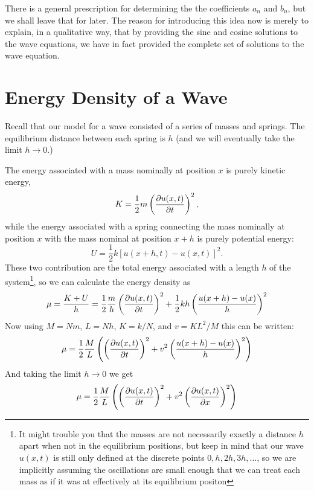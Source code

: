 \documentclass[12pt]{article}
\begin{document}
There is a general prescription for determining the the coefficients $a_n$ and $b_n$, but we shall leave that for later.   The reason for introducing this idea now is merely to explain, in a qualitative way, that by providing the sine and cosine solutions to the wave equations, we have in fact provided the complete set of solutions to the wave equation.

\section{Energy Density of a Wave}

Recall that our model for a wave consisted of a series of masses and
springs.  The equilibrium distance between each spring is $h$ (and we
will eventually take the limit $h \to 0$.)

The energy associated with a mass nominally at position $x$ is purely kinetic energy,
\begin{displaymath}
K = \frac{1}{2} m \left( \frac{\partial u(x,t)}{\partial t} \right)^2,
\end{displaymath}
while the energy associated with a spring connecting the mass nominally at position $x$ with the mass nominal at position $x+h$ is purely potential energy:
\begin{displaymath}
U = \frac{1}{2} k [u(x+h,t) - u(x,t)]^2.
\end{displaymath}
These two contribution are the total energy associated with a length
$h$ of the system\footnote{It might trouble you that the masses are
 not necessarily exactly a distance $h$ apart when not in the
 equilibrium positions, but keep in mind that our wave $u(x,t)$ is still only
 defined at the discrete points $0,h,2h,3h,...$, so we are implicitly
 assuming the oscillations are small enough that we can treat each mass as if
 it was at effectively at its equilibrium positon}, so we can calculate the energy density as
\begin{displaymath}
\mu = \frac{K + U}{h} = \frac{1}{2} \frac{m}{h} \left( \frac{\partial u(x,t)}{\partial t} \right)^2 + \frac{1}{2} k h \left( \frac{u(x+h)-u(x)}{h}\right)^2 
\end{displaymath}
Now using $M=Nm$, $L=Nh$, $K=k/N$, and $v = K L^2 / M$ this can be written:
\begin{displaymath}
\mu = \frac{1}{2} \frac{M}{L} \left( \left(\frac{\partial u(x,t)}{\partial t}\right)^2 + v^2 \left( \frac{u(x+h)-u(x)}{h} \right)^2\right) 
\end{displaymath}
And taking the limit $h \to 0$ we get
\begin{equation}\label{eqn:edensity}
\mu = \frac{1}{2} \frac{M}{L} \left( \left(\frac{\partial u(x,t)}{\partial t}\right)^2 + v^2 \left( \frac{\partial u(x,t)}{\partial x} \right)^2\right) 
\end{equation}
\end{document}
